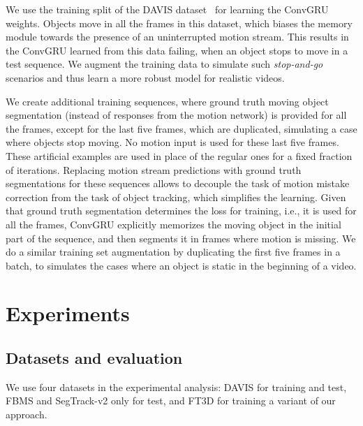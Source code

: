 \documentclass[10pt,twocolumn,letterpaper]{article}
\begin{document}
We use the training split of the DAVIS dataset~\cite{Perazzi16} for learning
the ConvGRU weights. Objects move in all the frames in this dataset, which
biases the memory module towards the presence of an uninterrupted motion
stream. This results in the ConvGRU learned from this data failing, when an
object stops to move in a test sequence. We augment the training data to
simulate such {\it stop-and-go} scenarios and thus learn a more robust model
for realistic videos.

We create additional training sequences, where ground truth moving object
segmentation (instead of responses from the motion network) is provided for all
the frames, except for the last five frames, which are duplicated, simulating a case where objects stop moving. No motion input is used for these
last five frames. These artificial examples are used in place of the regular ones for a fixed fraction of iterations. Replacing motion stream predictions with ground truth segmentations for these sequences allows to decouple the task of motion mistake correction from the task of object tracking, which simplifies the learning. Given that ground truth segmentation determines the loss for training,
i.e., it is used for all the frames, ConvGRU explicitly memorizes the moving
object in the initial part of the sequence, and then segments it in frames
where motion is missing. We do a similar training set augmentation by duplicating the first five frames in a batch, to simulates the cases where an object is static in the beginning of a video.

\section{Experiments}

\subsection{Datasets and evaluation}
We use four datasets in the experimental analysis: DAVIS for training and test,
FBMS and SegTrack-v2 only for test, and FT3D for training a variant of our
approach.
\end{document}
